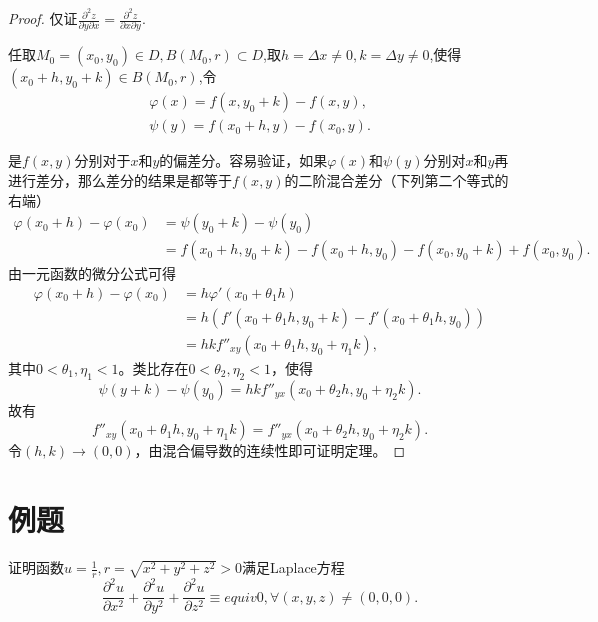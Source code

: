 \begin{proof}
    仅证$\frac{\partial^2 z}{\partial y \partial x} = \frac{\partial^2 z}{\partial x \partial y}$.
    
    任取$M_0 = (x_0,y_0) \in D, B(M_0, r) \subset D$,取$h = \Delta x \neq 0, k = \Delta y \neq 0$,使得$(x_0 + h, y_0 + k) \in B(M_0, r)$,令
    \begin{align*}
        \varphi(x) = f(x, y_0 + k) - f(x, y),\\
        \psi(y) = f(x_0 + h, y) - f(x_0, y).
    \end{align*}

    是$f(x, y)$分别对于$x$和$y$的偏差分。容易验证，如果$\varphi(x)$和$\psi(y)$分别对$x$和$y$再进行差分，那么差分的结果是都等于$f(x, y)$的二阶混合差分（下列第二个等式的右端）
\begin{align*}
    \varphi(x_0 +h) - \varphi(x_0) & = \psi(y_0 +k) - \psi(y_0) \\
    &= f(x_0 + h, y_0 + k) - f(x_0 + h, y_0) - f(x_0, y_0 + k) + f(x_0, y_0).
\end{align*}
由一元函数的微分公式可得
\begin{align*}
    \varphi(x_0 + h) - \varphi(x_0) & = h \varphi' (x_0 + \theta_1 h) \\
    & = h \left(f'(x_0 + \theta_1 h, y_0 + k) - f'(x_0 + \theta_1 h, y_0)\right) \\
    & = h k f''_{xy}(x_0 + \theta_1 h, y_0 + \eta_1 k),
\end{align*}
其中$0 < \theta_1, \eta_1 < 1$。类比存在$0 < \theta_2, \eta_2 < 1$，使得
$$
\psi(y + k) - \psi(y_0) = h k f''_{yx}(x_0 + \theta_2 h, y_0 + \eta_2 k).
$$
故有
$$
f''_{xy}(x_0 + \theta_1 h, y_0 + \eta_1 k) = f''_{yx}(x_0 + \theta_2 h, y_0 + \eta_2 k).
$$
令$(h, k) \to (0, 0)$，由混合偏导数的连续性即可证明定理。
\end{proof}

\section{例题}

\begin{example}
    证明函数$u = \frac{1}{r} , r = \sqrt{x^2 + y^2 + z^2 } >0$满足Laplace方程
    $$
    \frac{\partial^2 u}{\partial x^2} + \frac{\partial^2 u}{\partial y^2} + \frac{\partial^2 u}{\partial z^2} \equiv equiv 0, \forall (x,y,z) \neq (0,0,0).
    $$
\end{example}

